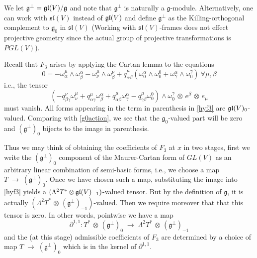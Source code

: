 \documentclass[11pt]{amsart}
\theoremstyle{definition}
\theoremstyle{remark}
\numberwithin{equation}{section}
\def\ooo#1#2{\omega^{#1}_{#2}}\def\xxx#1#2{x^{#1}_{#2}}
\def\oo#1{\omega^{#1}_0}
\def\qq#1#2#3{q^{#1}_{{#2} {#3}}}
\def\ww{\wedge}
\def\upperp{{}^\perp}
\def\fsl{{\mathfrak {sl}}}
\def\fg{{\mathfrak g}}
\def\a{\alpha}
\def\b{\beta}
\def\g{\gamma}
\def\ot{{\mathord{\,\otimes }\,}}
\def\ra{{\mathord{\;\rightarrow\;}}}
\def\La#1{\Lambda^{#1}}
\begin{document}
We let $\fg\upperp= \fgl(V)/\fg$   and note that
$\fg\upperp$ is naturally a $\fg$-module.  Alternatively,
one can work with $\fsl (V)$ instead of $\mathfrak g\mathfrak l(V)$ and define $\fg\upperp$ as 
the Killing-orthogonal complement to $\fg_0$ in   $\fsl(V)$ 
(Working with $\fsl(V)$-frames   does not effect projective geometry 
since the actual group of projective transformations
is $PGL(V)$). 

\smallskip

Recall that $F_3$ arises by applying the Cartan lemma to the equations
\begin{equation}\label{hyf3a}
0=-\ooo\mu\a\ww\ooo\a\b-\ooo\mu\nu\ww\ooo\nu\b +\qq\mu\a\b(\ooo\a 0\ww\oo 0 +
\ooo\a\g\ww\oo\g) \ \forall \mu,\b
\end{equation}
i.e., the tensor
\begin{equation}\label{hyf3}
(-\qq\nu\b\g \ooo\mu\nu +\qq\mu\a\g \ooo\a\b
 +
\qq\mu\a\b\ooo\a\g-\qq\mu\g\b \oo 0 )\ww\oo\g\ot  e^{\b}\ot e_{\mu}
\end{equation}
must vanish.
All forms appearing in the term in parenthesis in \eqref{hyf3}
are $\mathfrak g\mathfrak l(V)_0$-valued. Comparing with \eqref{g0action}, we see
that the $\fg_0$-valued part will
be zero and   $ (\fg\upperp)_0$ bijects to the image in
parenthesis.
 




Thus 
we may think of   obtaining the coefficients of $F_3$ at $x$ in two stages,
first we write the $(\fg\upperp)_0$ component of the Maurer-Cartan form
of $GL(V)$ as an arbitrary linear combination
of semi-basic forms, i.e., we choose a map
$T\ra(\fg\upperp)_0$. Once we have chosen such a map,
substituting the image into    \eqref{hyf3} yields a
$ (\La 2 T^*\ot \fgl(V)_{-1})$-valued tensor.
But by the definition of $\fg$, it is actually 
$ (\La 2 T^*\ot (\fg\upperp)_{-1})$-valued.
Then we require moreover that that this tensor is zero. 
In other words, pointwise we have a map
$$
\partial^{1,1}: T^*\ot (\fg\upperp)_0 \ra \La 2T^*\ot (\fg\upperp)_{-1}
$$
and the (at this stage) admissible coefficients of $F_3$ are determined by a choice of map $T\ra(\fg\upperp)_0$ which is in the kernel
of $\partial^{1,1}$.

\smallskip
\end{document}

